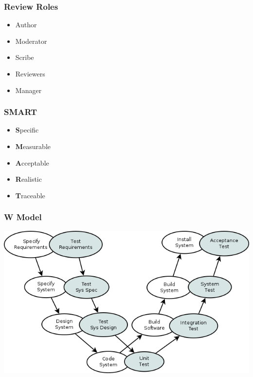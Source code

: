 \begin{frame}
    \frametitle{Review Roles}
    \begin{itemize}
        \item Author
        \item Moderator
        \item Scribe
        \item Reviewers
        \item Manager
    \end{itemize}
\end{frame}

\begin{frame}
    \frametitle{SMART}
    \begin{itemize}
        \item \textbf{S}pecific
        \item \textbf{M}easurable
        \item \textbf{A}cceptable %
        \item \textbf{R}ealistic %
        \item \textbf{T}raceable %
    \end{itemize}
\end{frame}

\begin{frame}
    \frametitle{W Model}
    \begin{center}
        \includegraphics[scale=0.4]{w_model.png}
    \end{center}
\end{frame}


